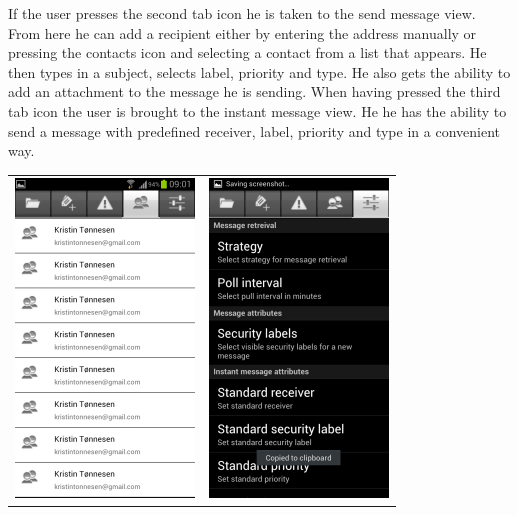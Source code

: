 If the user presses the second tab icon he is taken to the send message view. From here he can add a recipient either by entering the address manually or pressing the contacts icon and selecting a contact from a list that appears. He then types in a subject, selects label, priority and type. He also gets the ability to add an attachment to the message he is sending. 
\newline
\newline
When having pressed the third tab icon the user is brought to the instant message view. He he has the ability to send a message with predefined receiver, label, priority and type in a convenient way.
\newline
\begin{tabular}{cc}
\includegraphics{contacts} & \includegraphics{settingsgui}
\end{tabular}

